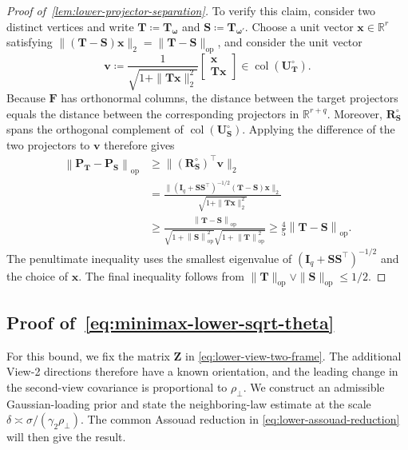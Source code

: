 \documentclass[11pt]{article}
\newcommand{\trans}{\top}
\DeclareMathOperator{\col}{col}
\newcommand{\opn}[1]{\left\lVert #1\right\rVert_{\mathrm{op}}}
\begin{document}
\begin{proof}[Proof of~\cref{lem:lower-projector-separation}]
   To verify this claim, consider two distinct vertices and write
$\bm T\coloneqq\bm T_{\bm\omega}$ and
$\bm S\coloneqq\bm T_{\bm\omega'}$.  Choose a unit vector
$\bm x\in\mathbb R^r$ satisfying
$\|(\bm T-\bm S)\bm x\|_2
=\|\bm T-\bm S\|_{\mathrm{op}}$, and consider the unit vector
\[
  \bm v
  \coloneqq
  \frac{1}{\sqrt{1+\|\bm T\bm x\|_2^2}}
  \begin{bmatrix}
    \bm x\\
    \bm T\bm x
  \end{bmatrix}
  \in\col(\bm U_{\bm T}^{\circ}).
\]
Because $\bm F$ has orthonormal columns, the distance between the target
projectors equals the distance between the corresponding projectors in
$\mathbb R^{r+q}$.  Moreover,
$\bm R_{\bm S}^{\circ}$ spans the orthogonal complement of
$\col(\bm U_{\bm S}^{\circ})$.  Applying the difference of the two
projectors to $\bm v$ therefore gives
\begin{align*}
  \opn{\bm P_{\bm T}-\bm P_{\bm S}}
  &\ge
  \|(\bm R_{\bm S}^{\circ})^\trans\bm v\|_2\\
  &=
  \frac{
    \|(\bm I_q+\bm S\bm S^\trans)^{-1/2}
      (\bm T-\bm S)\bm x\|_2
  }{
    \sqrt{1+\|\bm T\bm x\|_2^2}
  }\\
  &\ge
  \frac{
    \opn{\bm T-\bm S}
  }{
    \sqrt{1+\opn{\bm S}^2}
    \sqrt{1+\opn{\bm T}^2}
  }
  \ge
  \frac45\opn{\bm T-\bm S}.
\end{align*}
The penultimate inequality uses the smallest eigenvalue of
$(\bm I_q+\bm S\bm S^\trans)^{-1/2}$ and the choice of $\bm x$.
The final inequality follows from
$\|\bm T\|_{\mathrm{op}}\vee\|\bm S\|_{\mathrm{op}}\le1/2$. 
\end{proof}


\subsection{Proof of~\cref{eq:minimax-lower-sqrt-theta}}

For this bound, we fix the matrix $\bm Z$ in
\cref{eq:lower-view-two-frame}.  The additional View-2 directions therefore
have a known orientation, and the leading change in the second-view covariance
is proportional to $\rho_\perp$.  We construct an admissible Gaussian-loading
prior and state the neighboring-law estimate at the scale
$\delta\asymp\sigma/(\gamma_2\rho_\perp)$.  The common Assouad reduction in
\cref{eq:lower-assouad-reduction} will then give the result.
\end{document}
